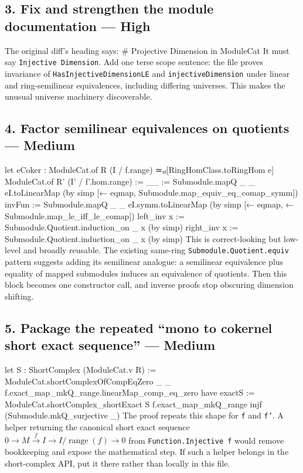 \documentclass[10pt]{article}
\newenvironment{lean}{\Verbatim[fontsize=\scriptsize,frame=single,framesep=2mm,formatcom=\leanfont]}{\endVerbatim}
\newcommand{\high}{\textcolor{priority}{\textbf{High}}}
\newcommand{\med}{\textbf{Medium}}
\begin{document}
\subsection*{3. Fix and strengthen the module documentation --- \high}
The original diff's heading says:
\begin{lean}
# Projective Dimension in ModuleCat
\end{lean}
It must say \texttt{Injective Dimension}. Add one terse scope sentence: the file proves invariance of
\texttt{HasInjectiveDimensionLE} and \texttt{injectiveDimension} under linear and ring-semilinear
equivalences, including differing universes. This makes the unusual universe machinery discoverable.

\subsection*{4. Factor semilinear equivalences on quotients --- \med}
\begin{lean}
let eCoker : ModuleCat.of R (I / f.range) ≃ₛₗ[RingHomClass.toRingHom e]
    ModuleCat.of R' (I' / f'.hom.range) := {
  __ := Submodule.mapQ _ _ eI.toLinearMap
    (by simp [← eqmap, Submodule.map_equiv_eq_comap_symm])
  invFun := Submodule.mapQ _ _ eI.symm.toLinearMap
    (by simp [← eqmap, ← Submodule.map_le_iff_le_comap])
  left_inv x := Submodule.Quotient.induction_on _ x (by simp)
  right_inv x := Submodule.Quotient.induction_on _ x (by simp) }
\end{lean}
This is correct-looking but low-level and broadly reusable. The existing same-ring
\texttt{Submodule.Quotient.equiv} pattern suggests adding its semilinear analogue: a semilinear
equivalence plus equality of mapped submodules induces an equivalence of quotients. Then this block
becomes one constructor call, and inverse proofs stop obscuring dimension shifting.

\subsection*{5. Package the repeated ``mono to cokernel short exact sequence'' --- \med}
\begin{lean}
let S : ShortComplex (ModuleCat.{v} R) :=
  ModuleCat.shortComplexOfCompEqZero _ _
    f.exact_map_mkQ_range.linearMap_comp_eq_zero
have exactS := ModuleCat.shortComplex_shortExact S
  f.exact_map_mkQ_range injf (Submodule.mkQ_surjective _)
\end{lean}
The proof repeats this shape for \texttt{f} and \texttt{f'}. A helper returning the canonical short
exact sequence
\(0\to M\xrightarrow f I\to I/\operatorname{range}(f)\to0\)
from \texttt{Function.Injective f} would remove bookkeeping and expose the mathematical step. If such
a helper belongs in the short-complex API, put it there rather than locally in this file.
\end{document}
